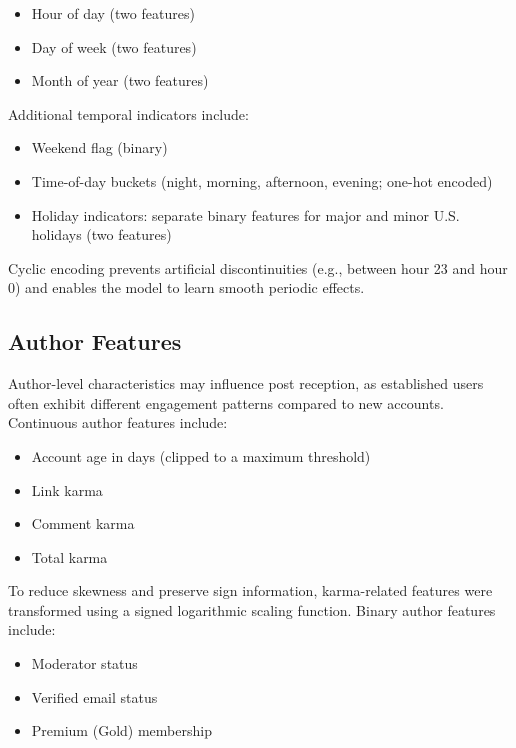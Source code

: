 \begin{itemize}
    \item Hour of day (two features)
    \item Day of week (two features)
    \item Month of year (two features)
\end{itemize}

Additional temporal indicators include:

\begin{itemize}
    \item Weekend flag (binary)
    \item Time-of-day buckets (night, morning, afternoon, evening; one-hot encoded)
    \item Holiday indicators: separate binary features for major and minor U.S. holidays (two features)
\end{itemize}

Cyclic encoding prevents artificial discontinuities (e.g., between hour 23 and hour 0) and enables the model to learn smooth periodic effects.

\subsection{Author Features}

Author-level characteristics may influence post reception, as established users often exhibit different engagement patterns compared to new accounts.
Continuous author features include:

\begin{itemize}
    \item Account age in days (clipped to a maximum threshold)
    \item Link karma
    \item Comment karma
    \item Total karma
\end{itemize}

To reduce skewness and preserve sign information, karma-related features were transformed using a signed logarithmic scaling function.
Binary author features include:

\begin{itemize}
    \item Moderator status
    \item Verified email status
    \item Premium (Gold) membership
\end{itemize}

